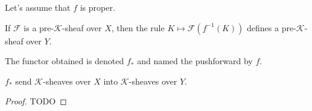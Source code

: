 Let's assume that $f$ is proper.

\begin{definition}\label{def:pushforward_of_K-sheaf}
    If $\mathcal{F}$ is a pre-$\mathcal{K}$-sheaf over $X$, then the rule $K\mapsto \mathcal{F}(f^{-1}(K))$ defines a pre-$\mathcal{K}$-sheaf over $Y$.

    The functor obtained is denoted $f_*$ and named the pushforward by $f$.

    $f_*$ send $\mathcal{K}$-sheaves over $X$ into $\mathcal{K}$-sheaves over $Y$.
\end{definition}

\begin{proof}
    TODO
\end{proof}


